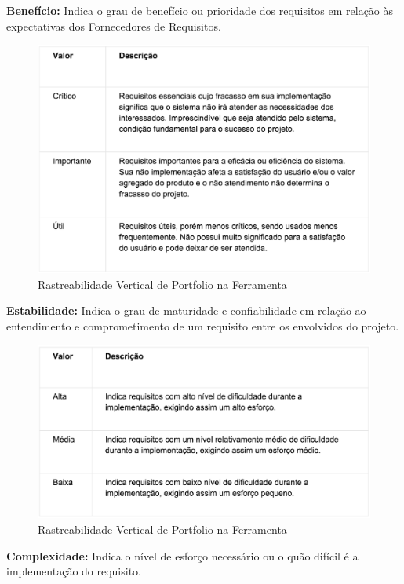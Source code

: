 \textbf{Benefício:} Indica o grau de benefício ou prioridade dos requisitos em relação às
expectativas dos Fornecedores de Requisitos.

\begin{figure}[H]
    \centering
	\includegraphics[keepaspectratio=true,scale=0.7]{figuras/atr1.eps}
    \caption{ Rastreabilidade Vertical de Portfolio na Ferramenta}
    \label{fig:ras}
\end{figure}

\textbf{Estabilidade:} Indica o grau de maturidade e confiabilidade em relação ao entendimento
e comprometimento de um requisito entre os envolvidos do projeto.

\begin{figure}[H]
    \centering
	\includegraphics[keepaspectratio=true,scale=0.7]{figuras/atr3.eps}
    \caption{ Rastreabilidade Vertical de Portfolio na Ferramenta}
    \label{fig:ras}
\end{figure}

\textbf{Complexidade:} Indica o nível de esforço necessário ou o quão difícil é a implementação do requisito.

